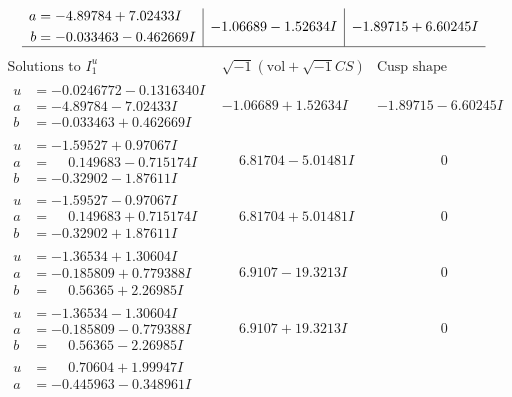 \documentclass[1p]{elsarticle_modified}
\theoremstyle{definition}
\newcommand{\I}{\sqrt{-1}}
\begin{document}
$$\begin{array}{c|c|c}
\begin{aligned}
a &= -4.89784 + 7.02433 I \\
b &= -0.033463 - 0.462669 I\end{aligned}
 & -1.06689 - 1.52634 I & -1.89715 + 6.60245 I\\
 \hline 
 \end{array}$$\newpage$$\begin{array}{c|c|c}  
\text{Solutions to }I^u_{1}& \I (\text{vol} + \sqrt{-1}CS) & \text{Cusp shape}\\
 \hline 
\begin{aligned}
u &= -0.0246772 - 0.1316340 I \\
a &= -4.89784 - 7.02433 I \\
b &= -0.033463 + 0.462669 I\end{aligned}
 & -1.06689 + 1.52634 I & -1.89715 - 6.60245 I \\ \hline\begin{aligned}
u &= -1.59527 + 0.97067 I \\
a &= \phantom{-}0.149683 - 0.715174 I \\
b &= -0.32902 - 1.87611 I\end{aligned}
 & \phantom{-}6.81704 - 5.01481 I & \phantom{-0.000000 } 0 \\ \hline\begin{aligned}
u &= -1.59527 - 0.97067 I \\
a &= \phantom{-}0.149683 + 0.715174 I \\
b &= -0.32902 + 1.87611 I\end{aligned}
 & \phantom{-}6.81704 + 5.01481 I & \phantom{-0.000000 } 0 \\ \hline\begin{aligned}
u &= -1.36534 + 1.30604 I \\
a &= -0.185809 + 0.779388 I \\
b &= \phantom{-}0.56365 + 2.26985 I\end{aligned}
 & \phantom{-}6.9107 - 19.3213 I & \phantom{-0.000000 } 0 \\ \hline\begin{aligned}
u &= -1.36534 - 1.30604 I \\
a &= -0.185809 - 0.779388 I \\
b &= \phantom{-}0.56365 - 2.26985 I\end{aligned}
 & \phantom{-}6.9107 + 19.3213 I & \phantom{-0.000000 } 0 \\ \hline\begin{aligned}
u &= \phantom{-}0.70604 + 1.99947 I \\
a &= -0.445963 - 0.348961 I \\

\end{aligned}
\end{array}$$
\end{document}
